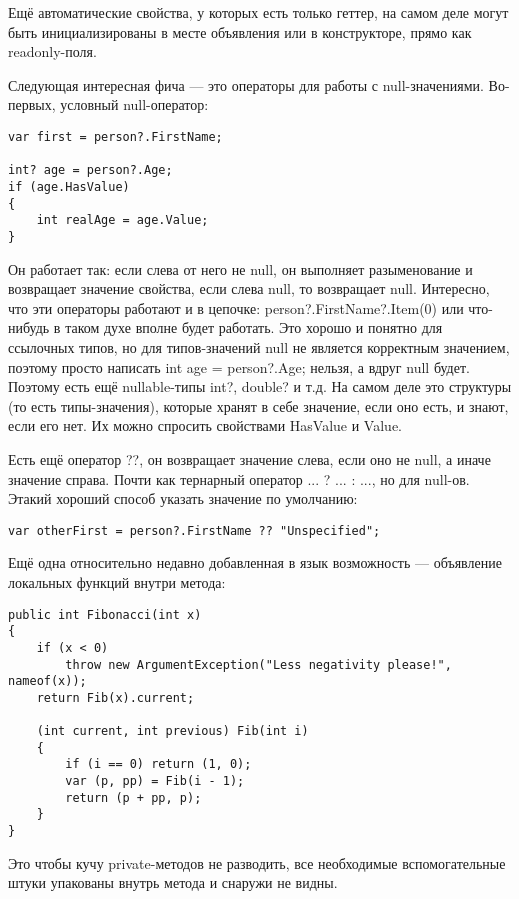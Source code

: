 \documentclass[a5paper]{article}
\begin{document}
Ещё автоматические свойства, у которых есть только геттер, на самом деле могут быть инициализированы в месте объявления или в конструкторе, прямо как readonly-поля.

Следующая интересная фича --- это операторы для работы с null-значениями. Во-первых, условный null-оператор:

\begin{verbatim}
var first = person?.FirstName;

int? age = person?.Age;
if (age.HasValue)
{
    int realAge = age.Value;
}
\end{verbatim}

Он работает так: если слева от него не null, он выполняет разыменование и возвращает значение свойства, если слева null, то возвращает null. Интересно, что эти операторы работают и в цепочке: person?.FirstName?.Item(0) или что-нибудь в таком духе вполне будет работать. Это хорошо и понятно для ссылочных типов, но для типов-значений null не является корректным значением, поэтому просто написать int age = person?.Age; нельзя, а вдруг null будет. Поэтому есть ещё nullable-типы int?, double? и т.д. На самом деле это структуры (то есть типы-значения), которые хранят в себе значение, если оно есть, и знают, если его нет. Их можно спросить свойствами HasValue и Value.

Есть ещё оператор ??, он возвращает значение слева, если оно не null, а иначе значение справа. Почти как тернарный оператор ... ? ... : ..., но для null-ов. Этакий хороший способ указать значение по умолчанию:

\begin{verbatim}
var otherFirst = person?.FirstName ?? "Unspecified";
\end{verbatim}

Ещё одна относительно недавно добавленная в язык возможность --- объявление локальных функций внутри метода:

\begin{verbatim}
public int Fibonacci(int x)
{
    if (x < 0) 
        throw new ArgumentException("Less negativity please!", nameof(x));
    return Fib(x).current;

    (int current, int previous) Fib(int i)
    {
        if (i == 0) return (1, 0);
        var (p, pp) = Fib(i - 1);
        return (p + pp, p);
    }
}
\end{verbatim}

Это чтобы кучу private-методов не разводить, все необходимые вспомогательные штуки упакованы внутрь метода и снаружи не видны.
\end{document}

